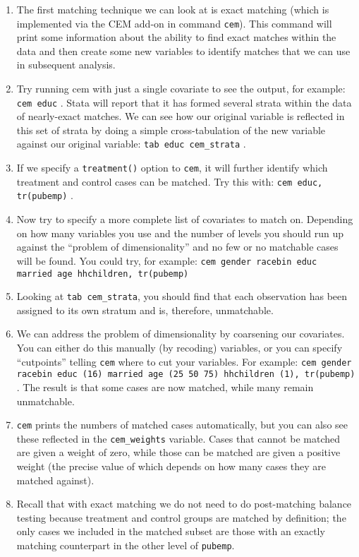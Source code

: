 \documentclass[a4paper,12pt]{article}
\begin{document}
\begin{enumerate}
\item The first matching technique we can look at is exact matching (which is implemented via the CEM add-on in command \texttt{cem}). This command will print some information about the ability to find exact matches within the data and then create some new variables to identify matches that we can use in subsequent analysis.
\item Try running cem with just a single covariate to see the output, for example: \texttt{cem educ} . Stata will report that it has formed several strata within the data of nearly-exact matches. We can see how our original variable is reflected in this set of strata by doing a simple cross-tabulation of the new variable against our original variable: \texttt{tab educ cem\_strata} .
\item If we specify a \texttt{treatment()} option to \texttt{cem}, it will further identify which treatment and control cases can be matched. Try this with: \texttt{cem educ, tr(pubemp)} .
\item Now try to specify a more complete list of covariates to match on. Depending on how many variables you use and the number of levels you should run up against the ``problem of dimensionality'' and no few or no matchable cases will be found. You could try, for example: \texttt{cem gender racebin educ married age hhchildren, tr(pubemp)}
\item Looking at \texttt{tab cem\_strata}, you should find that each observation has been assigned to its own stratum and is, therefore, unmatchable.
\item We can address the problem of dimensionality by coarsening our covariates. You can either do this manually (by recoding) variables, or you can specify ``cutpoints'' telling \texttt{cem} where to cut your variables. For example: \texttt{cem gender racebin educ (16) married age (25 50 75) hhchildren (1), tr(pubemp)} . The result is that some cases are now matched, while many remain unmatchable.
\item \texttt{cem} prints the numbers of matched cases automatically, but you can also see these reflected in the \texttt{cem\_weights} variable. Cases that cannot be matched are given a weight of zero, while those can be matched are given a positive weight (the precise value of which depends on how many cases they are matched against).
\item Recall that with exact matching we do not need to do post-matching balance testing because treatment and control groups are matched by definition; the only cases we included in the matched subset are those with an exactly matching counterpart in the other level of \texttt{pubemp}.


\end{enumerate}
\end{document}
